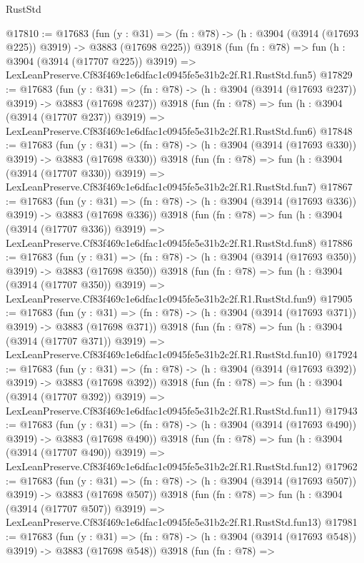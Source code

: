 \begin{lexlean}{RustStd}
\begin{coremodule}
@17810 := @17683
    (fun (y : @31) => (fn : @78) -> (h : @3904 (@3914 (@17693 @225)) @3919) -> @3883 (@17698 @225))
    @3918
    (fun (fn : @78) =>
    fun (h : @3904 (@3914 (@17707 @225)) @3919) =>
    LexLeanPreserve.Cf83f469c1e6dfac1c0945fe5e31b2c2f.R1.RustStd.fun5)
@17829 := @17683
    (fun (y : @31) => (fn : @78) -> (h : @3904 (@3914 (@17693 @237)) @3919) -> @3883 (@17698 @237))
    @3918
    (fun (fn : @78) =>
    fun (h : @3904 (@3914 (@17707 @237)) @3919) =>
    LexLeanPreserve.Cf83f469c1e6dfac1c0945fe5e31b2c2f.R1.RustStd.fun6)
@17848 := @17683
    (fun (y : @31) => (fn : @78) -> (h : @3904 (@3914 (@17693 @330)) @3919) -> @3883 (@17698 @330))
    @3918
    (fun (fn : @78) =>
    fun (h : @3904 (@3914 (@17707 @330)) @3919) =>
    LexLeanPreserve.Cf83f469c1e6dfac1c0945fe5e31b2c2f.R1.RustStd.fun7)
@17867 := @17683
    (fun (y : @31) => (fn : @78) -> (h : @3904 (@3914 (@17693 @336)) @3919) -> @3883 (@17698 @336))
    @3918
    (fun (fn : @78) =>
    fun (h : @3904 (@3914 (@17707 @336)) @3919) =>
    LexLeanPreserve.Cf83f469c1e6dfac1c0945fe5e31b2c2f.R1.RustStd.fun8)
@17886 := @17683
    (fun (y : @31) => (fn : @78) -> (h : @3904 (@3914 (@17693 @350)) @3919) -> @3883 (@17698 @350))
    @3918
    (fun (fn : @78) =>
    fun (h : @3904 (@3914 (@17707 @350)) @3919) =>
    LexLeanPreserve.Cf83f469c1e6dfac1c0945fe5e31b2c2f.R1.RustStd.fun9)
@17905 := @17683
    (fun (y : @31) => (fn : @78) -> (h : @3904 (@3914 (@17693 @371)) @3919) -> @3883 (@17698 @371))
    @3918
    (fun (fn : @78) =>
    fun (h : @3904 (@3914 (@17707 @371)) @3919) =>
    LexLeanPreserve.Cf83f469c1e6dfac1c0945fe5e31b2c2f.R1.RustStd.fun10)
@17924 := @17683
    (fun (y : @31) => (fn : @78) -> (h : @3904 (@3914 (@17693 @392)) @3919) -> @3883 (@17698 @392))
    @3918
    (fun (fn : @78) =>
    fun (h : @3904 (@3914 (@17707 @392)) @3919) =>
    LexLeanPreserve.Cf83f469c1e6dfac1c0945fe5e31b2c2f.R1.RustStd.fun11)
@17943 := @17683
    (fun (y : @31) => (fn : @78) -> (h : @3904 (@3914 (@17693 @490)) @3919) -> @3883 (@17698 @490))
    @3918
    (fun (fn : @78) =>
    fun (h : @3904 (@3914 (@17707 @490)) @3919) =>
    LexLeanPreserve.Cf83f469c1e6dfac1c0945fe5e31b2c2f.R1.RustStd.fun12)
@17962 := @17683
    (fun (y : @31) => (fn : @78) -> (h : @3904 (@3914 (@17693 @507)) @3919) -> @3883 (@17698 @507))
    @3918
    (fun (fn : @78) =>
    fun (h : @3904 (@3914 (@17707 @507)) @3919) =>
    LexLeanPreserve.Cf83f469c1e6dfac1c0945fe5e31b2c2f.R1.RustStd.fun13)
@17981 := @17683
    (fun (y : @31) => (fn : @78) -> (h : @3904 (@3914 (@17693 @548)) @3919) -> @3883 (@17698 @548))
    @3918
    (fun (fn : @78) =>

\end{coremodule}
\end{lexlean}

